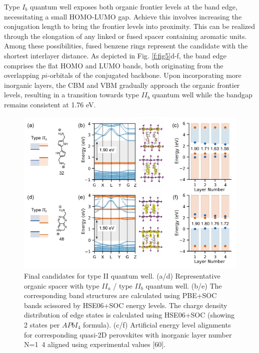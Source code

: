 Type $I_b$ quantum well exposes both organic frontier levels at the band edge, necessitating a small HOMO-LUMO gap. Achieve this involves increasing the conjugation length to bring the frontier levels into proximity. This can be realized through the elongation of any linked or fused spacer containing aromatic units. Among these possibilities, fused benzene rings represent the candidate with the shortest interlayer distance. As depicted in Fig. \ref{f:fig5}d-f, the band edge comprises the flat HOMO and LUMO bands, both originating from the overlapping $pi$-orbitals of the conjugated backbone. Upon incorporating more inorganic layers, the CBM and VBM gradually approach the organic frontier levels, resulting in a transition towards type $II_b$ quantum well while the bandgap remains consistent at 1.76 eV. 

\begin{figure}[!ht]
\centering
\includegraphics[width=\textwidth]{figures/high-throughput-calculation/figure6.pdf}
\caption[Final candidates for type II quantum well.]{Final candidates for type II quantum well. (a/d) Representative organic spacer with type $II_a$ / type $II_b$ quantum well. (b/e) The corresponding band structures are calculated using PBE+SOC bands scissored by HSE06+SOC energy levels. The charge density distribution of edge states is calculated using HSE06+SOC (showing 2 states per $APbI_4$ formula).  (c/f) Artificial energy level alignments for corresponding quasi-2D perovskites with inorganic layer number N=1~4 aligned using experimental values [60]. }
\label{f:fig6}
\end{figure}


